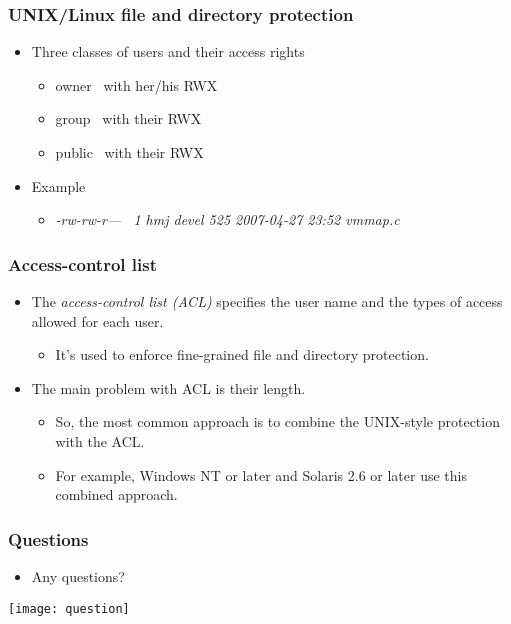 \documentclass[CJKutf8,dvipsnames,table]{beamer}
\begin{document}
\begin{CJK*}{UTF8}{song}
  \begin{frame}
    \frametitle{UNIX/Linux file and directory protection} \pause
    \begin{itemize}
    \item Three classes of users and their access rights
      \begin{itemize}\parskip=0pt
      \item \color{red}owner\color{black} \  with  her/his  RWX \pause
      \item \color{blue}group\color{black} \  with  their    RWX \pause
      \item \color{green}public\color{black} \  with  their    RWX \pause
      \end{itemize}
    \item Example \pause
      \begin{itemize}
      \item \emph{-\color{red}rw-\color{blue}rw-\color{green}r---\color{black} \  1 \color{red}hmj\color{black} \color{blue}devel\color{black} 525 2007-04-27 23:52 vmmap.c}
      \end{itemize}
    \end{itemize}
  \end{frame}

  \begin{frame}
    \frametitle{Access-control list} \pause
    \begin{itemize}
    \item The \emph{access-control list (ACL)} specifies the user name and the types of access allowed for each user. \pause
      \begin{itemize}
      \item It's used to enforce fine-grained file and directory protection. \pause
      \end{itemize}
    \item The main problem with ACL is their length. \pause
      \begin{itemize}
      \item So, the most common approach is to combine the UNIX-style protection with the ACL. \pause
      \item For example, Windows NT or later and Solaris 2.6 or later use this combined approach.
      \end{itemize}
    \end{itemize}
  \end{frame}
  
  \begin{frame}
    \frametitle{Questions}
    \begin{itemize}
    \item Any questions?
    \end{itemize}
    \begin{center}
      \texttt{[image: question]}
    \end{center}
  \end{frame}
  

\end{CJK*}
\end{document}
